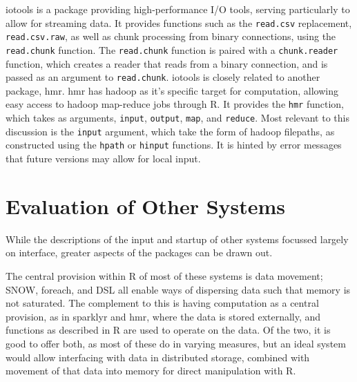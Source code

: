 \documentclass[a4paper,10pt]{article}
\begin{document}
iotools is a package providing high-performance I/O tools, serving particularly
to allow for streaming data\cite{urbanek20}.
It provides functions such as the \texttt{read.csv} replacement,
\texttt{read.csv.raw}, as well as chunk processing from binary
connections, using the \texttt{read.chunk} function. 
The \texttt{read.chunk} function is paired with a
\texttt{chunk.reader} function, which creates a reader that reads from
a binary connection, and is passed as an argument to
\texttt{read.chunk}.
iotools is closely related to another package, hmr\cite{urbanek20b}.
hmr has hadoop as it's specific target for computation, allowing easy access to
hadoop map-reduce jobs through R.
It provides the \texttt{hmr} function, which takes as arguments,
\texttt{input}, \texttt{output}, \texttt{map}, and
\texttt{reduce}.
Most relevant to this discussion is the \texttt{input} argument, which
take the form of hadoop filepaths, as constructed using the
\texttt{hpath} or \texttt{hinput} functions.
It is hinted by error messages that future versions may allow for local input.

\section{Evaluation of Other Systems}

While the descriptions of the input and startup of other systems focussed
largely on interface, greater aspects of the packages can be drawn out.

The central provision within R of most of these systems is data movement; SNOW,
foreach, and DSL all enable ways of dispersing data such that memory is not
saturated.
The complement to this is having computation as a central provision, as in
sparklyr and hmr, where the data is stored externally, and functions as
described in R are used to operate on the data.
Of the two, it is good to offer both, as most of these do in varying measures,
but an ideal system would allow interfacing with data in distributed storage,
combined with movement of that data into memory for direct manipulation with R.
\end{document}
